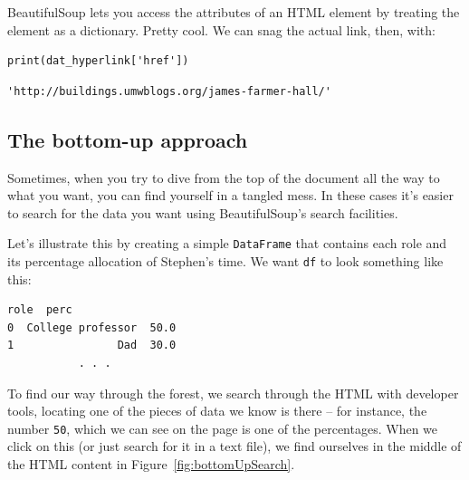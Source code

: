 \label{dictSyntax}

BeautifulSoup lets you access the attributes of an HTML element by treating
the element as a dictionary. Pretty cool. We can snag the actual link, then,
with:

\begin{Verbatim}[fontsize=\small,samepage=true,frame=single,framesep=3mm]
print(dat_hyperlink['href'])
\end{Verbatim}
\vspace{-.2in}

\begin{Verbatim}[fontsize=\small,samepage=true,frame=leftline,framesep=5mm,framerule=1mm]
'http://buildings.umwblogs.org/james-farmer-hall/'
\end{Verbatim}

\subsection{The bottom-up approach}

Sometimes, when you try to dive from the top of the document all the way to
what you want, you can find yourself in a tangled mess. In these cases it's
easier to search for the data you want using BeautifulSoup's search facilities.

Let's illustrate this by creating a simple \texttt{DataFrame} that contains
each role and its percentage allocation of Stephen's time. We want \texttt{df}
to look something like this:

\begin{Verbatim}[fontsize=\small,samepage=true,frame=leftline,framesep=5mm,framerule=1mm]
                role  perc
0  College professor  50.0
1                Dad  30.0
           . . .
\end{Verbatim}

To find our way through the forest, we search through the HTML with developer
tools, locating one of the pieces of data we know is there -- for instance, the
number \texttt{50}, which we can see on the page is one of the percentages.
When we click on this (or just search for it in a text file), we find ourselves
in the middle of the HTML content in Figure~\ref{fig:bottomUpSearch}.

